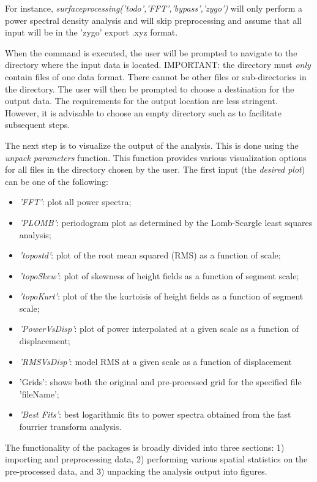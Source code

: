 \documentclass[12pt,a4paper]{article}
\begin{document}
For instance, \textit{surfaceprocessing('todo','FFT','bypass','zygo')} will only perform a power spectral density analysis and will skip preprocessing and assume that all input will be in the 'zygo' export .xyz format.

When the command is executed, the user will be prompted to navigate to the directory where the input data is located. IMPORTANT: the directory must \textit{only} contain files of one data format. There cannot be other files or sub-directories in the directory. The user will then be prompted to choose a destination for the output data. The requirements for the output location are less stringent. However, it is advisable to choose an empty directory such as to facilitate subsequent steps.

The next step is to visualize the output of the analysis. This is done using the \textit{unpack parameters} function. This function provides various visualization options for all files in the directory chosen by the user. The first input (the \textit{desired plot}) can be one of the following:

\begin{itemize}
\item[] \textit{'FFT'}: plot all power spectra;
\item[] \textit{'PLOMB'}: periodogram plot as determined by the Lomb-Scargle least squares analysis;
\item[] \textit{'topostd'}: plot of the root mean squared (RMS) as a function of scale;
\item[] \textit{'topoSkew'}: plot of skewness of height fields as a function of segment scale;
\item[] \textit{'topoKurt'}: plot of the the kurtoisis of height fields as a function of segment scale;
\item[] \textit{'PowerVsDisp'}: plot of power interpolated at a given scale as a function of displacement;
\item[] \textit{'RMSVsDisp'}: model RMS at a given scale as a function of displacement
\item[] 'Grids': shows both the original and pre-processed grid for the specified file 'fileName';
\item[] \textit{'Best Fits'}: best logarithmic fits to power spectra obtained from the fast fourrier transform analysis.
\end{itemize}

The functionality of the packages is broadly divided into three sections: 1) importing and preprocessing data, 2) performing various spatial statistics on the pre-processed data, and 3) unpacking the analysis output into figures.
\end{document}
